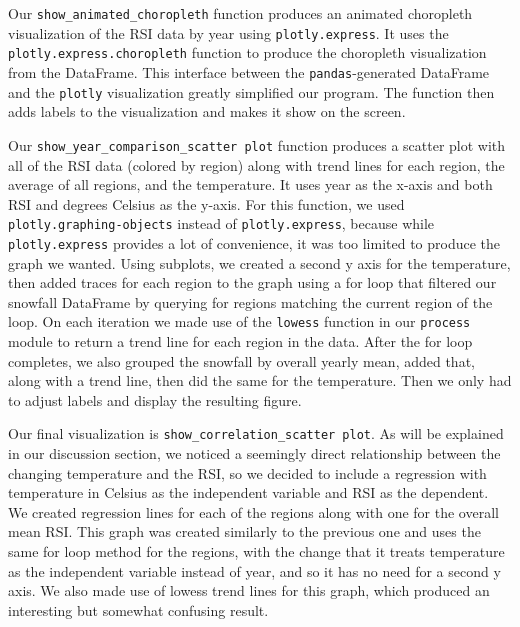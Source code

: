 \documentclass[fontsize=11pt]{article}
\begin{document}
Our \texttt{show\_animated\_choropleth} function produces an animated choropleth visualization of the RSI data by year using \texttt{plotly.express}. It uses the \texttt{plotly.express.choropleth} function to produce the choropleth visualization from the DataFrame. This interface between the \texttt{pandas}-generated DataFrame and the \texttt{plotly} visualization greatly simplified our program. The function then adds labels to the visualization and makes it show on the screen.

Our \texttt{show\_year\_comparison\_scatter plot} function produces a scatter plot with all of the RSI data (colored by region) along with trend lines for each region, the average of all regions, and the temperature. It uses year as the x-axis and both RSI and degrees Celsius as the y-axis. For this function, we used \texttt{plotly.graphing-objects} instead of \texttt{plotly.express}, because while \texttt{plotly.express} provides a lot of convenience, it was too limited to produce the graph we wanted. Using subplots, we created a second y axis for the temperature, then added traces for each region to the graph using a for loop that filtered our snowfall DataFrame by querying for regions matching the current region of the loop. On each iteration we made use of the \texttt{lowess} function in our \texttt{process} module to return a trend line for each region in the data. After the for loop completes, we also grouped the snowfall by overall yearly mean, added that, along with a trend line, then did the same for the temperature. Then we only had to adjust labels and display the resulting figure.

Our final visualization is \texttt{show\_correlation\_scatter plot}. As will be explained in our discussion section, we noticed a seemingly direct relationship between the changing temperature and the RSI, so we decided to include a regression with temperature in Celsius as the independent variable and RSI as the dependent. We created regression lines for each of the regions along with one for the overall mean RSI. This graph was created similarly to the previous one and uses the same for loop method for the regions, with the change that it treats temperature as the independent variable instead of year, and so it has no need for a second y axis. We also made use of lowess trend lines for this graph, which produced an interesting but somewhat confusing result.




    
\end{document}
